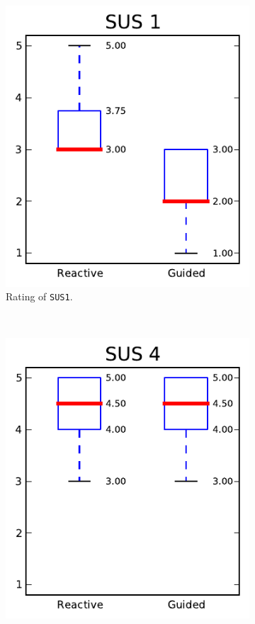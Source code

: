 \begin{figure}[h!]
\centering
\begin{subfigure}[t]{0.32\textwidth}
\centering
\includegraphics[width=\textwidth]{img/graphs/4a_00.pdf}
\caption{Rating of \texttt{SUS1}.}
\end{subfigure}%
~
\begin{subfigure}[t]{0.32\textwidth}
\centering
\includegraphics[width=\textwidth]{img/graphs/4a_03.pdf}

\end{subfigure}
\end{figure}
